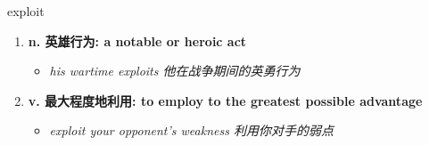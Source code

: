 
\begin{frame}
{\huge exploit}
\begin{center}
\begin{enumerate}\Large
  \item \textbf{n. 英雄行为: a notable or heroic act}
  \begin{itemize}
    \item \em{\Large{his wartime exploits 他在战争期间的英勇行为}}
  \end{itemize}
  \item \textbf{v. 最大程度地利用: to employ to the greatest possible advantage}
  \begin{itemize}
    \item \em{\Large{exploit your opponent's weakness 利用你对手的弱点}}
  \end{itemize}
\end{enumerate}
\end{center}
\end{frame}
